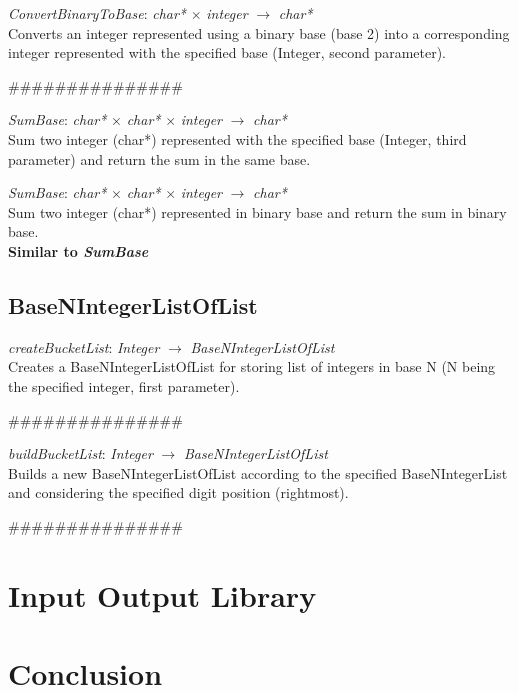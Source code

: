\documentclass[book, backcover, english, nodocumentinfo]{upmethodology-document}
\newcommand{\nxtalgo}{\centerline{$$$$\#\#\#\#\#\#\#\#\#\#\#\#\#\#\#$$$$}}
\begin{document}
		\begin{minipage}{\linewidth}
			\textit{ConvertBinaryToBase}: \textit{char*} $\times$ \textit{integer} $\rightarrow$ \textit{char*}\\
			Converts an integer represented using a binary base (base 2) into a corresponding integer represented with the specified base (Integer, second parameter).
			\label{algo:BNIL-ConvertBinaryToBase}
			
		\end{minipage}
		\nxtalgo{}

		\begin{minipage}{\linewidth}
			\textit{SumBase}: \textit{char*} $\times$  \textit{char*} $\times$  \textit{integer} $\rightarrow$ \textit{char*}\\
			Sum two integer (char*) represented with the specified base (Integer, third parameter) and return the sum in the same base.
			\label{algo:BNIL-SumBase}
			
		\end{minipage}

		\begin{minipage}{\linewidth}
			\textit{SumBase}: \textit{char*} $\times$  \textit{char*} $\times$  \textit{integer} $\rightarrow$ \textit{char*}\\
			Sum two integer (char*) represented in binary base and return the sum in binary base.
			\label{algo:BNIL-SumBinary}\\
			\textbf{Similar to \textit{SumBase}}
		\end{minipage}

	\section{BaseNIntegerListOfList}

		\begin{minipage}{\linewidth}
			\textit{createBucketList}: \textit{Integer} $\rightarrow$ \textit{BaseNIntegerListOfList}\\
			Creates a BaseNIntegerListOfList for storing list of integers in base N (N being the specified integer, first parameter).
			\label{algo:BNIL-CreateBucketList}
			
		\end{minipage}
		\nxtalgo{}

		\begin{minipage}{\linewidth}
			\textit{buildBucketList}: \textit{Integer} $\rightarrow$ \textit{BaseNIntegerListOfList}\\
			Builds a new BaseNIntegerListOfList according to the specified BaseNIntegerList and considering the specified digit position (rightmost).
			\label{algo:BNIL-BuildBucketList}
			
		\end{minipage}
		\nxtalgo{}

\chapter{Input Output Library} \label{chapter:IO-Lib}
\chapter{Conclusion} \label{chapter:Conclusion}
\end{document}
